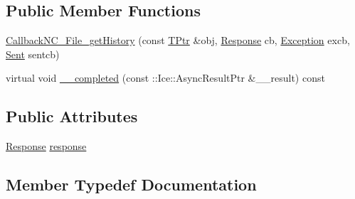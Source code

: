 \subsection*{Public Member Functions}
\begin{DoxyCompactItemize}
\item 
\hyperlink{class_file_system_1_1_callback_n_c___file__get_history_ae52fe43d18b6869f34b2c64d10f6b91e}{Callback\+N\+C\+\_\+\+File\+\_\+get\+History} (const \hyperlink{class_file_system_1_1_callback_n_c___file__get_history_ae005e81d63a5bdcf9b9aafc40a28ff6b}{T\+Ptr} \&obj, \hyperlink{class_file_system_1_1_callback_n_c___file__get_history_a7fef6c01133235ae7b604366d356eae4}{Response} cb, \hyperlink{class_file_system_1_1_callback_n_c___file__get_history_a828dbde2a7dd89e32a5e98ea6a92c9a7}{Exception} excb, \hyperlink{class_file_system_1_1_callback_n_c___file__get_history_a9e909ff9b45d83e890c037566c529f6e}{Sent} sentcb)
\item 
virtual void \hyperlink{class_file_system_1_1_callback_n_c___file__get_history_a50cc232102d6f3cbc98da14381058b98}{\+\_\+\+\_\+completed} (const \+::Ice\+::\+Async\+Result\+Ptr \&\+\_\+\+\_\+result) const 
\end{DoxyCompactItemize}
\subsection*{Public Attributes}
\begin{DoxyCompactItemize}
\item 
\hyperlink{class_file_system_1_1_callback_n_c___file__get_history_a7fef6c01133235ae7b604366d356eae4}{Response} \hyperlink{class_file_system_1_1_callback_n_c___file__get_history_a81615ddfea371f53f4227fba28da454f}{response}
\end{DoxyCompactItemize}


\subsection{Member Typedef Documentation}
\hypertarget{class_file_system_1_1_callback_n_c___file__get_history_a828dbde2a7dd89e32a5e98ea6a92c9a7}{}
